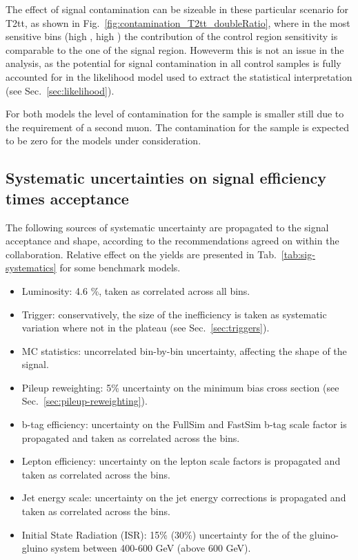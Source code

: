 The effect of signal contamination can be sizeable in these particular scenario for T2tt, 
as shown in Fig.~\ref{fig:contamination_T2tt_doubleRatio}, where in the most sensitive bins 
(high \nb, high \nj) the contribution of the control region sensitivity is comparable to 
the one of the signal region. Howeverm this is not an issue in the analysis, as 
the potential for signal contamination in all control samples
is fully accounted for in the likelihood model used to extract
the statistical interpretation (see Sec.~\ref{sec:likelihood}). 

For both models the level of contamination for the
\mmj sample is smaller still due to the requirement of a second
muon. The contamination for the \gj sample is expected to be zero for
the models under consideration. 

\subsection{Systematic uncertainties on signal efficiency times acceptance}
\label{sec:sig-syst}
The following sources of systematic uncertainty are propagated to the signal acceptance and shape, 
according to the recommendations agreed on within the collaboration. 
Relative effect on the yields are presented in Tab.~\ref{tab:sig-systematics} for some benchmark models. 

\begin{itemize}
  \item Luminosity: 4.6 \%, taken as correlated across all bins.
  \item Trigger: conservatively, the size of the inefficiency is taken as systematic variation 
    where not in the plateau (see Sec.~\ref{sec:triggers}). 
  \item MC statistics:  uncorrelated bin-by-bin uncertainty, affecting the shape of the signal. 
  \item Pileup reweighting: 5\% uncertainty on the minimum bias cross section (see Sec.~\ref{sec:pileup-reweighting}).
  \item b-tag efficiency: uncertainty on the FullSim and FastSim b-tag scale factor is propagated and taken as correlated across the bins. 
  \item Lepton efficiency: uncertainty on the lepton scale factors is propagated and taken as correlated across the bins. 
  \item Jet energy scale: uncertainty on the jet energy corrections is propagated and taken as correlated across the bins.
  \item Initial State Radiation (ISR): 15\% (30\%) uncertainty for the \Pt of the gluino-gluino system between 400-600 GeV (above 600 GeV). 
\end{itemize}



